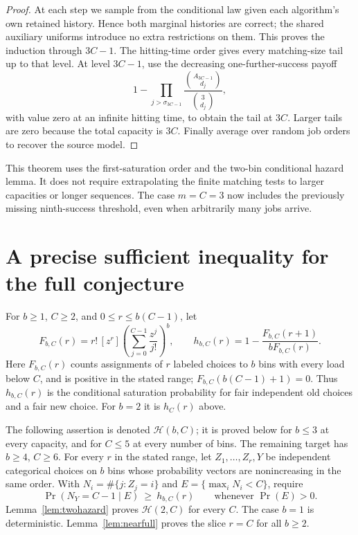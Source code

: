 \documentclass[11pt]{article}
\begin{document}
\begin{proof}
At each step we sample from the conditional law given each algorithm's
own retained history. Hence both marginal histories are correct;
the shared auxiliary uniforms introduce no extra restrictions on them.
This proves the induction through $3C-1$. The hitting-time order gives
every matching-size tail up to that level. At level $3C-1$, use the
decreasing one-further-success payoff
\[
 1-\prod_{j>\sigma_{3C-1}}
          \frac{\binom{A_{3C-1}}{d_j}}{\binom3{d_j}},
\]
with value zero at an infinite hitting time, to obtain the tail at
$3C$. Larger tails are zero because the total capacity is $3C$.
Finally average over random job orders to recover the source model.
\end{proof}

This theorem uses the first-saturation order and the two-bin conditional
hazard lemma. It does not require extrapolating the finite matching
tests to larger capacities or longer sequences. The case $m=C=3$ now
includes the previously missing ninth-success threshold, even when
arbitrarily many jobs arrive.

\section{A precise sufficient inequality for the full conjecture}
For $b\geq1$, $C\geq2$, and $0\leq r\leq b(C-1)$, let
\[
 F_{b,C}(r)=r!\,[z^r]\left(\sum_{j=0}^{C-1}\frac{z^j}{j!}\right)^b,
 \qquad
 h_{b,C}(r)=1-\frac{F_{b,C}(r+1)}{b F_{b,C}(r)}.
\]
Here $F_{b,C}(r)$ counts assignments of $r$ labeled choices to $b$
bins with every load below $C$, and is positive in the stated range;
$F_{b,C}(b(C-1)+1)=0$. Thus $h_{b,C}(r)$ is the conditional
saturation probability for fair independent old choices and a fair
new choice. For $b=2$ it is $h_C(r)$ above.

The following assertion is denoted $\mathcal H(b,C)$; it is proved
below for $b\leq3$ at every capacity, and for $C\leq5$ at every
number of bins. The remaining target has $b\geq4$, $C\geq6$.
For every $r$ in the stated range,
let $Z_1,\ldots,Z_r,Y$ be independent categorical choices on $b$ bins
whose probability vectors are nonincreasing in the same order. With
$N_i=\#\{j:Z_j=i\}$ and $E=\{\max_iN_i<C\}$, require
\begin{equation}\label{eq:generalhazard}
 \Pr(N_Y=C-1\mid E)\ \geq\ h_{b,C}(r)
 \qquad\text{whenever }\Pr(E)>0.
\end{equation}
Lemma~\ref{lem:twohazard} proves $\mathcal H(2,C)$ for every $C$.
The case $b=1$ is deterministic. Lemma~\ref{lem:nearfull} proves
the slice $r=C$ for all $b\geq2$.
\end{document}
